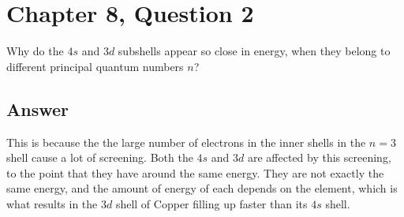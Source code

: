 \documentclass[12pt]{article}
\begin{document}


            

            
    
    \section{Chapter 8, Question 2}
        Why do the $4s$ and $3d$ subshells appear so close in energy, when they belong to different principal quantum numbers $n$?

        \subsection{Answer}
            This is because the the large number of electrons in the inner shells in the $n = 3$ shell cause a lot of screening.
            Both the $4s$ and $3d$ are affected by this screening, to the point that they have around the same energy.
            They are not exactly the same energy, and the amount of energy of each depends on the element, which is what results in the $3d$ shell of Copper filling up faster than its $4s$ shell. 
    
\end{document}
